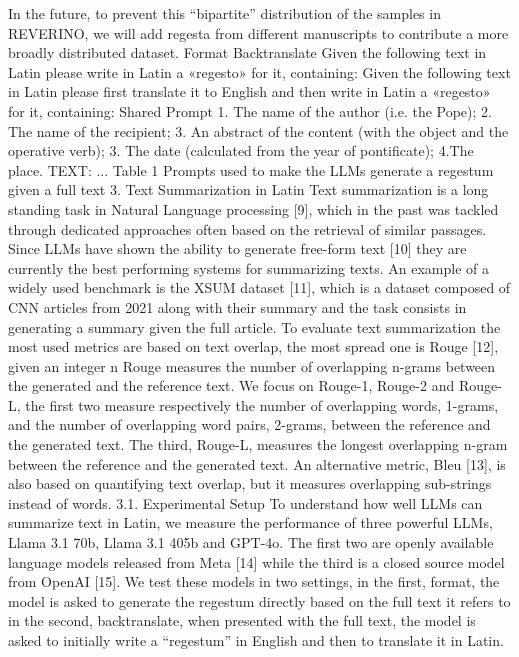 {In the future, to prevent this “bipartite” distribution of the samples in REVERINO, we will add regesta
from different manuscripts to contribute a more broadly distributed dataset.
Format Backtranslate
Given the following text in Latin please write in
Latin a «regesto» for it, containing:
Given the following text in Latin please first
translate it to English and then write in Latin a
«regesto» for it, containing:
Shared Prompt
1. The name of the author (i.e. the Pope); 2. The name of the recipient; 3. An abstract of the content
(with the object and the operative verb); 3. The date (calculated from the year of pontificate); 4.The
place. TEXT: ...
Table 1
Prompts used to make the LLMs generate a regestum given a full text
3. Text Summarization in Latin
Text summarization is a long standing task in Natural Language processing [9], which in the past was
tackled through dedicated approaches often based on the retrieval of similar passages. Since LLMs
have shown the ability to generate free-form text [10] they are currently the best performing systems
for summarizing texts. An example of a widely used benchmark is the XSUM dataset [11], which
is a dataset composed of CNN articles from 2021 along with their summary and the task consists in
generating a summary given the full article.
To evaluate text summarization the most used metrics are based on text overlap, the most spread
one is Rouge [12], given an integer n Rouge measures the number of overlapping n-grams between the
generated and the reference text. We focus on Rouge-1, Rouge-2 and Rouge-L, the first two measure
respectively the number of overlapping words, 1-grams, and the number of overlapping word pairs,
2-grams, between the reference and the generated text. The third, Rouge-L, measures the longest
overlapping n-gram between the reference and the generated text.
An alternative metric, Bleu [13], is also based on quantifying text overlap, but it measures overlapping
sub-strings instead of words.
3.1. Experimental Setup
To understand how well LLMs can summarize text in Latin, we measure the performance of three
powerful LLMs, Llama 3.1 70b, Llama 3.1 405b and GPT-4o. The first two are openly available language
models released from Meta [14] while the third is a closed source model from OpenAI [15]. We test
these models in two settings, in the first, format, the model is asked to generate the regestum directly
based on the full text it refers to in the second, backtranslate, when presented with the full text, the
model is asked to initially write a “regestum” in English and then to translate it in Latin.
}
